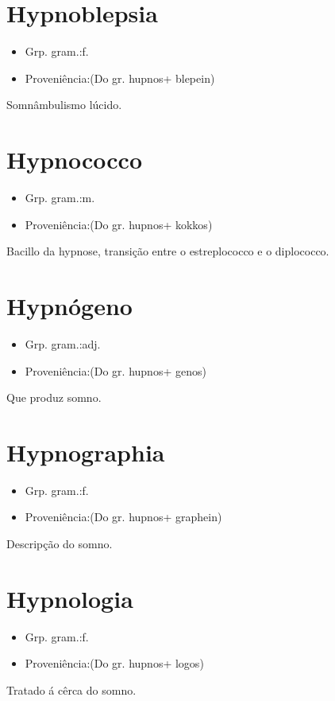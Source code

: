 \documentclass{article}
\begin{document}
\section{Hypnoblepsia}
\begin{itemize}
\item {Grp. gram.:f.}
\end{itemize}
\begin{itemize}
\item {Proveniência:(Do gr. \textunderscore hupnos\textunderscore  + \textunderscore blepein\textunderscore )}
\end{itemize}
Somnâmbulismo lúcido.
\section{Hypnococco}
\begin{itemize}
\item {Grp. gram.:m.}
\end{itemize}
\begin{itemize}
\item {Proveniência:(Do gr. \textunderscore hupnos\textunderscore  + \textunderscore kokkos\textunderscore )}
\end{itemize}
Bacillo da hypnose, transição entre o estreplococco e o diplococco.
\section{Hypnógeno}
\begin{itemize}
\item {Grp. gram.:adj.}
\end{itemize}
\begin{itemize}
\item {Proveniência:(Do gr. \textunderscore hupnos\textunderscore  + \textunderscore genos\textunderscore )}
\end{itemize}
Que produz somno.
\section{Hypnographia}
\begin{itemize}
\item {Grp. gram.:f.}
\end{itemize}
\begin{itemize}
\item {Proveniência:(Do gr. \textunderscore hupnos\textunderscore  + \textunderscore graphein\textunderscore )}
\end{itemize}
Descripção do somno.
\section{Hypnologia}
\begin{itemize}
\item {Grp. gram.:f.}
\end{itemize}
\begin{itemize}
\item {Proveniência:(Do gr. \textunderscore hupnos\textunderscore  + \textunderscore logos\textunderscore )}
\end{itemize}
Tratado á cêrca do somno.
\end{document}
